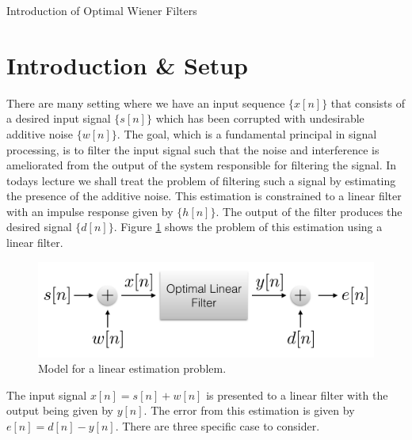 \documentclass[12pt]{article}
\begin{document}
\pagestyle{fancy}
\cfoot{  }
\rfoot{\today}


\begin{center}
  {\huge
    Introduction of Optimal Wiener Filters
  }
\end{center}










\section{Introduction \& Setup}
There are many setting where we have an input sequence $\{x[n]\}$ that consists of a desired input signal $\{s[n]\}$ which has been corrupted with undesirable additive noise $\{w[n]\}$. The goal, which is a fundamental principal in signal processing, is to filter the input signal such that the noise and interference is ameliorated from the output of the system responsible for filtering the signal. In todays lecture we shall treat the problem of filtering such a signal by estimating the presence of the additive noise. This estimation is constrained to a linear filter with an impulse response given by $\{h[n]\}$. The output of the filter produces the desired signal $\{d[n]\}$. Figure \ref{fig:lin est} shows the problem of this estimation using a linear filter. 

\begin{figure}[h!]
  \centering
  \includegraphics[width=.7\textwidth]{wiener.pdf}
  \caption{Model for a linear estimation problem. }
  \label{fig:lin est}
\end{figure}

The input signal $x[n] = s[n]+w[n]$ is presented to a linear filter with the output being given by $y[n]$. The error from this estimation is given by $e[n] = d[n] - y[n]$. There are three specific case to consider. 
\end{document}
